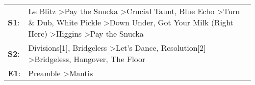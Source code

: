 \begin{supertabular}{p{0.03\textwidth}p{0.92\textwidth}}
 \textbf{S1}:  &  Le Blitz\textsuperscript{} \textgreater \enspace Pay the Snucka\textsuperscript{} \textgreater \enspace Crucial Taunt\textsuperscript{}, \enspace Blue Echo\textsuperscript{} \textgreater \enspace Turn \& Dub\textsuperscript{}, \enspace White Pickle\textsuperscript{} \textgreater \enspace Down Under\textsuperscript{}, \enspace Got Your Milk (Right Here)\textsuperscript{} \textgreater \enspace Higgins\textsuperscript{} \textgreater \enspace Pay the Snucka\textsuperscript{}  \enspace  \\
 \textbf{S2}:  &                                                                                                                                                                                            Divisions[1]\textsuperscript{}, \enspace Bridgeless\textsuperscript{} \textgreater \enspace Let's Dance\textsuperscript{}, \enspace Resolution[2]\textsuperscript{} \textgreater \enspace Bridgeless\textsuperscript{}, \enspace Hangover\textsuperscript{}, \enspace The Floor\textsuperscript{}  \enspace  \\
 \textbf{E1}:  &                                                                                                                                                                                                                                                                                                                                                                                                                    Preamble\textsuperscript{} \textgreater \enspace Mantis\textsuperscript{}  \enspace  \\
\end{supertabular}
